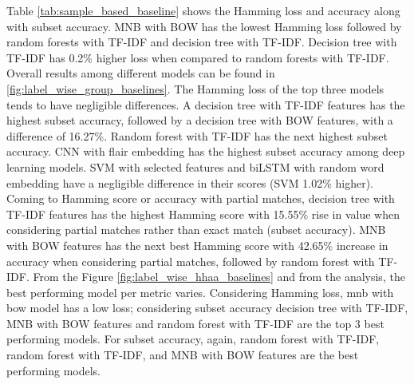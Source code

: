 Table \ref{tab:sample_based_baseline} shows the Hamming loss and accuracy along with subset accuracy. MNB with BOW has the lowest Hamming loss followed by random forests with TF-IDF and decision tree with TF-IDF. Decision tree with TF-IDF has 0.2\% higher loss when compared to random forests with TF-IDF. Overall results among different models can be found in \ref{fig:label_wise_group_baselines}. The Hamming loss of the top three models tends to have negligible differences. A decision tree with TF-IDF features has the highest subset accuracy, followed by a decision tree with BOW features, with a difference of 16.27\%. Random forest with TF-IDF has the next highest subset accuracy. CNN with flair embedding has the highest subset accuracy among deep learning models. SVM with selected features and biLSTM with random word embedding have a negligible difference in their scores (SVM 1.02\% higher).  Coming to Hamming score or accuracy with partial matches, decision tree with TF-IDF features has the highest Hamming score with 15.55\% rise in value when considering partial matches rather than exact match (subset accuracy). MNB with BOW features has the next best Hamming score with 42.65\% increase in accuracy when considering partial matches, followed by random forest with TF-IDF. From the Figure \ref{fig:label_wise_hhaa_baselines} and from the analysis, the best performing model per metric varies. Considering Hamming loss, \acrlong{mnb} with \acrlong{bow} model has a low loss; considering subset accuracy decision tree with TF-IDF, MNB with BOW features and random forest with TF-IDF are the top 3 best performing models. For subset accuracy, again, random forest with TF-IDF,  random forest with TF-IDF, and MNB with BOW features are the best performing models.
